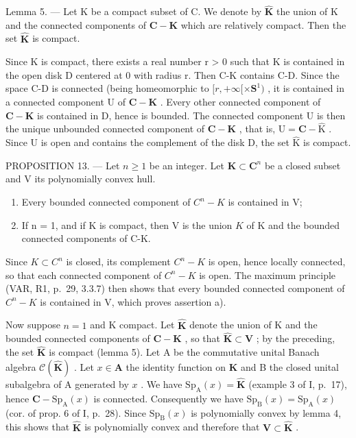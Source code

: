 Lemma 5. --- Let K be a compact subset of C. We denote by \(\widehat{\mathbf{K}}\) the union of K and the connected components of \(\mathbf{C} - \mathbf{K}\) which are relatively compact. Then the set \(\widehat{\mathbf{K}}\) is compact.

Since K is compact, there exists a real number r > 0 such that K is contained in the open disk D centered at 0 with radius r. Then C-K contains C-D. Since the space C-D is connected (being homeomorphic to \([r, +\infty[\times\mathbf{S}^1)\) , it is contained in a connected component U of \(\mathbf{C}-\mathbf{K}\) . Every other connected component of \(\mathbf{C}-\mathbf{K}\) is contained in D, hence is bounded. The connected component U is then the unique unbounded connected component of \(\mathbf{C}-\mathbf{K}\) , that is, \(\mathrm{U} = \mathbf{C}-\widehat{\mathrm{K}}\) . Since U is open and contains the complement of the disk D, the set \(\widehat{\mathrm{K}}\) is compact.

PROPOSITION 13. --- Let \(n \geqslant 1\) be an integer. Let \(\mathbf{K} \subset \mathbf{C}^{n}\) be a closed subset and V its polynomially convex hull.

\begin{enumerate}
\def\labelenumi{\alph{enumi})}
\item
  Every bounded connected component of \(C^{n} - K\) is contained in V;
\item
  If n = 1, and if K is compact, then V is the union \(\widehat{K}\) of K and the bounded connected components of C-K.
\end{enumerate}

Since \(K \subset C^{n}\) is closed, its complement \(C^{n}-K\) is open, hence locally connected, so that each connected component of \(C^{n}-K\) is open. The maximum principle (VAR, R1, p.~29, 3.3.7) then shows that every bounded connected component of \(C^{n}-K\) is contained in V, which proves assertion a).

Now suppose \(n = 1\) and K compact. Let \(\widehat{\mathbf{K}}\) denote the union of K and the bounded connected components of \(\mathbf{C} - \mathbf{K}\) , so that \(\widehat{\mathbf{K}} \subset \mathbf{V}\) ; by the preceding, the set \(\widehat{\mathbf{K}}\) is compact (lemma 5). Let A be the commutative unital Banach algebra \(\mathcal{C}(\widehat{\mathbf{K}})\) . Let \(x \in \mathbf{A}\) the identity function on \(\widehat{\mathbf{K}}\) and B the closed unital subalgebra of A generated by \(x\) . We have \(\mathrm{Sp}_{\mathrm{A}}(x) = \widehat{\mathbf{K}}\) (example 3 of I, p.~17), hence \(\mathbf{C} - \mathrm{Sp}_{\mathrm{A}}(x)\) is connected. Consequently we have \(\mathrm{Sp}_{\mathrm{B}}(x) = \mathrm{Sp}_{\mathrm{A}}(x)\) (cor. of prop. 6 of I, p.~28). Since \(\mathrm{Sp}_{\mathrm{B}}(x)\) is polynomially convex by lemma 4, this shows that \(\widehat{\mathbf{K}}\) is polynomially convex and therefore that \(\mathbf{V} \subset \widehat{\mathbf{K}}\) .

